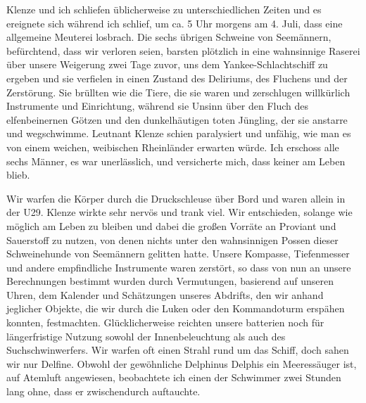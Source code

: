 \documentclass[a4paper]{memoir}
\begin{document}
Klenze und ich schliefen üblicherweise zu unterschiedlichen Zeiten und es ereignete sich während ich schlief, um ca. 5 Uhr morgens am 4. Juli, dass eine allgemeine Meuterei losbrach. Die sechs übrigen Schweine von Seemännern, befürchtend, dass wir verloren seien, barsten plötzlich in eine wahnsinnige Raserei über unsere Weigerung zwei Tage zuvor, uns dem Yankee-Schlachtschiff zu ergeben und sie verfielen in einen Zustand des Deliriums, des Fluchens und der Zerstörung. Sie brüllten wie die Tiere, die sie waren und zerschlugen willkürlich Instrumente und Einrichtung, während sie Unsinn über den Fluch des elfenbeinernen Götzen und den dunkelhäutigen toten Jüngling, der sie anstarre und wegschwimme. Leutnant Klenze schien paralysiert und unfähig, wie man es von einem weichen, weibischen Rheinländer erwarten würde. Ich erschoss alle sechs Männer, es war unerlässlich, und versicherte mich, dass keiner am Leben blieb.

Wir warfen die Körper durch die Druckschleuse über Bord und waren allein in der U29. Klenze wirkte sehr nervös und trank viel. Wir entschieden, solange wie möglich am Leben zu bleiben und dabei die großen Vorräte an Proviant und Sauerstoff zu nutzen, von denen nichts unter den wahnsinnigen Possen dieser Schweinehunde von Seemännern gelitten hatte. Unsere Kompasse, Tiefenmesser und andere empfindliche Instrumente waren zerstört, so dass von nun an unsere Berechnungen bestimmt wurden durch Vermutungen, basierend auf unseren Uhren, dem Kalender und Schätzungen unseres Abdrifts, den wir anhand jeglicher Objekte, die wir durch die Luken oder den Kommandoturm erspähen konnten, festmachten. Glücklicherweise reichten unsere batterien noch für längerfristige Nutzung sowohl der Innenbeleuchtung als auch des Suchschwinwerfers. Wir warfen oft einen Strahl rund um das Schiff, doch sahen wir nur Delfine. Obwohl der gewöhnliche Delphinus Delphis ein Meeressäuger ist, auf Atemluft angewiesen, beobachtete ich einen der Schwimmer zwei Stunden lang ohne, dass er zwischendurch auftauchte.
\end{document}
